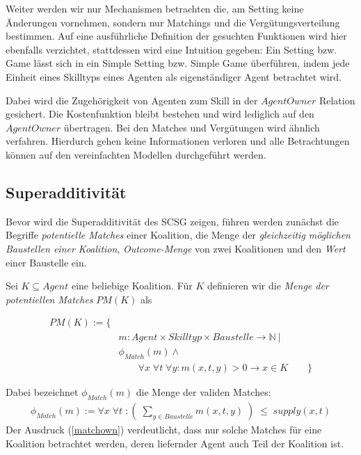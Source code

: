 \documentclass[sigconf]{acmart}
\theoremstyle{break}
\begin{document}
\noindent
Weiter werden wir nur Mechanismen betrachten die, am Setting keine Änderungen vornehmen, sondern nur Matchings und die Vergütungsverteilung bestimmen. Auf eine ausführliche Definition der gesuchten Funktionen wird hier ebenfalls verzichtet,  stattdessen wird eine Intuition gegeben: Ein Setting bzw. Game lässt sich in ein Simple Setting bzw. Simple Game überführen, indem jede Einheit eines Skilltyps eines Agenten als eigenständiger Agent betrachtet wird.

Dabei wird die Zugehörigkeit von Agenten zum Skill in der $AgentOwner$ Relation gesichert. Die Kostenfunktion bleibt bestehen und wird lediglich auf den $AgentOwner$ übertragen. Bei den Matches und Vergütungen wird ähnlich verfahren. Hierdurch gehen keine Informationen verloren und alle Betrachtungen können auf den vereinfachten Modellen durchgeführt werden.

\subsection{Superadditivität}
\label{supadd}
Bevor wird die Superadditivität des SCSG zeigen, führen werden zunächst die Begriffe \textit{potentielle Matches} einer Koalition, die Menge der \textit{gleichzeitig möglichen Baustellen einer Koalition}, \textit{Outcome-Menge} von zwei Koalitionen und den \textit{Wert} einer Baustelle ein.

\begin{definition}
  Sei $K\subseteq Agent$ eine beliebige Koalition. Für $K$ definieren wir die \textit{Menge der potentiellen Matches} $PM(K)$ als

  \begin{eqnarray}
    PM(K) := \{ &\\
    & m: Agent \times Skilltyp \times Baustelle \rightarrow \mathbb{N}\ |\\
    & \phi_{Match}(m) \land \\
    & \quad \quad \forall x\;\forall t\;\forall y: m(x,t, y) > 0 \rightarrow x\in K \quad \quad\} \label{matchown}
  \end{eqnarray}

  Dabei bezeichnet $\phi_{Match}(m)$ die Menge der validen Matches:
  \begin{eqnarray}
    \phi_{Match}(m) := \forall x\; \forall t\; : \left(\;\sum_{y\in Baustelle} m(x,t,y)\;\right)\;\leq \;supply(x,t)
  \end{eqnarray}
  Der Ausdruck (\ref{matchown}) verdeutlicht, dass nur solche Matches für eine Koalition betrachtet werden, deren liefernder Agent auch Teil der Koalition ist.
\end{definition}
\end{document}
